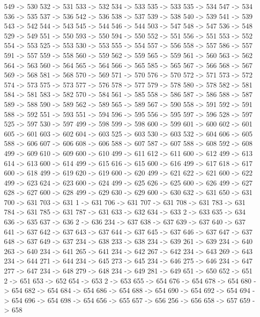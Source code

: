 {	549 -> 530
	532 -> 531
	533 -> 532
	534 -> 533
	535 -> 533
	535 -> 534
	547 -> 534
	536 -> 535
	537 -> 536
	542 -> 536
	538 -> 537
	539 -> 538
	540 -> 539
	541 -> 539
	543 -> 542
	544 -> 543
	545 -> 544
	546 -> 544
	503 -> 547
	548 -> 547
	536 -> 548
	529 -> 549
	551 -> 550
	593 -> 550
	594 -> 550
	552 -> 551
	556 -> 551
	553 -> 552
	554 -> 553
	525 -> 553
	530 -> 553
	555 -> 554
	557 -> 556
	558 -> 557
	586 -> 557
	591 -> 557
	559 -> 558
	560 -> 559
	562 -> 559
	565 -> 559
	561 -> 560
	563 -> 562
	564 -> 563
	560 -> 564
	565 -> 564
	566 -> 565
	585 -> 565
	567 -> 566
	568 -> 567
	569 -> 568
	581 -> 568
	570 -> 569
	571 -> 570
	576 -> 570
	572 -> 571
	573 -> 572
	574 -> 573
	575 -> 573
	577 -> 576
	578 -> 577
	579 -> 578
	580 -> 578
	582 -> 581
	584 -> 581
	583 -> 582
	570 -> 584
	561 -> 585
	558 -> 586
	587 -> 586
	588 -> 587
	589 -> 588
	590 -> 589
	562 -> 589
	565 -> 589
	567 -> 590
	558 -> 591
	592 -> 591
	588 -> 592
	551 -> 593
	551 -> 594
	596 -> 595
	556 -> 595
	597 -> 596
	528 -> 597
	525 -> 597
	530 -> 597
	499 -> 598
	599 -> 598
	600 -> 599
	601 -> 600
	602 -> 601
	605 -> 601
	603 -> 602
	604 -> 603
	525 -> 603
	530 -> 603
	532 -> 604
	606 -> 605
	588 -> 606
	607 -> 606
	608 -> 606
	588 -> 607
	587 -> 607
	588 -> 608
	592 -> 608
	499 -> 609
	610 -> 609
	600 -> 610
	499 -> 611
	612 -> 611
	600 -> 612
	499 -> 613
	614 -> 613
	600 -> 614
	499 -> 615
	616 -> 615
	600 -> 616
	499 -> 617
	618 -> 617
	600 -> 618
	499 -> 619
	620 -> 619
	600 -> 620
	499 -> 621
	622 -> 621
	600 -> 622
	499 -> 623
	624 -> 623
	600 -> 624
	499 -> 625
	626 -> 625
	600 -> 626
	499 -> 627
	628 -> 627
	600 -> 628
	499 -> 629
	630 -> 629
	600 -> 630
	632 -> 631
	650 -> 631
	700 -> 631
	703 -> 631
	1 -> 631
	706 -> 631
	707 -> 631
	708 -> 631
	783 -> 631
	784 -> 631
	785 -> 631
	787 -> 631
	633 -> 632
	634 -> 633
	2 -> 633
	635 -> 634
	636 -> 635
	637 -> 636
	2 -> 636
	234 -> 637
	638 -> 637
	639 -> 637
	640 -> 637
	641 -> 637
	642 -> 637
	643 -> 637
	644 -> 637
	645 -> 637
	646 -> 637
	647 -> 637
	648 -> 637
	649 -> 637
	234 -> 638
	233 -> 638
	234 -> 639
	261 -> 639
	234 -> 640
	263 -> 640
	234 -> 641
	265 -> 641
	234 -> 642
	267 -> 642
	234 -> 643
	269 -> 643
	234 -> 644
	271 -> 644
	234 -> 645
	273 -> 645
	234 -> 646
	275 -> 646
	234 -> 647
	277 -> 647
	234 -> 648
	279 -> 648
	234 -> 649
	281 -> 649
	651 -> 650
	652 -> 651
	2 -> 651
	653 -> 652
	654 -> 653
	2 -> 653
	655 -> 654
	676 -> 654
	678 -> 654
	680 -> 654
	682 -> 654
	684 -> 654
	686 -> 654
	688 -> 654
	690 -> 654
	692 -> 654
	694 -> 654
	696 -> 654
	698 -> 654
	656 -> 655
	657 -> 656
	256 -> 656
	658 -> 657
	659 -> 658
}
